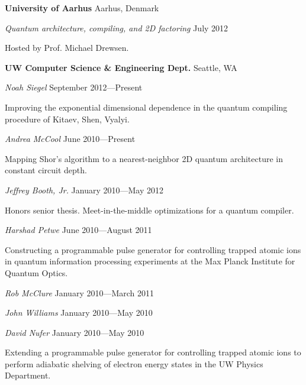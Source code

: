 \documentclass[letter]{article}
\begin{document}
\vspace{\baselineskip}
\par
{\bf {University of Aarhus}} \hfill Aarhus, Denmark
\par
{\em Quantum architecture, compiling, and 2D factoring} \hfill July 2012
\par
Hosted by Prof. Michael Drewsen.

\pagebreak

\vspace{\baselineskip}
\par
{\bf {UW Computer Science \& Engineering Dept.}} \hfill Seattle, WA
\par

\vspace{0.5\baselineskip}
\par
\emph{Noah Siegel} \hfill September 2012---Present
\par
Improving the exponential dimensional dependence in the quantum compiling
procedure of Kitaev, Shen, Vyalyi.

\vspace{0.5\baselineskip}
\par
\emph{Andrea McCool} \hfill June 2010---Present
\par
Mapping Shor's algorithm to a nearest-neighbor 2D quantum architecture in
constant circuit depth.

\vspace{0.5\baselineskip}
\par
\emph{Jeffrey Booth, Jr.} \hfill January 2010---May 2012
\par
Honors senior thesis. Meet-in-the-middle optimizations for a quantum compiler.

\vspace{0.5\baselineskip}
\par
\emph{Harshad Petwe} \hfill June 2010---August 2011
\par
Constructing a programmable pulse generator for controlling trapped atomic
ions in quantum information processing experiments at the Max Planck Institute
for Quantum Optics.

\vspace{0.5\baselineskip}
\par
\emph{Rob McClure} \hfill January 2010---March 2011
\par
\emph{John Williams} \hfill January 2010---May 2010
\par
\emph{David Nufer} \hfill January 2010---May 2010
\par
Extending a programmable pulse generator for controlling trapped atomic
ions to perform adiabatic shelving of electron energy states in the UW
Physics Department.
\end{document}
